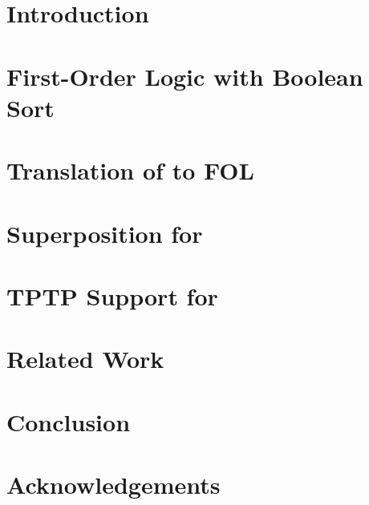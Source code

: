 \section{Introduction}
\label{sec:cicm15/introduction}



\section[First-Order Logic with Boolean Sort]{First-Order Logic with Boolean Sort}
\label{sec:folbool}



\section{Translation of \folb{} to FOL}
\label{sec:folb-to-fol}



\section{Superposition for \folb{}}
\label{sec:superposition}



\section{TPTP Support for \folb{}}
\label{sec:tptp}



\section{Related Work}
\label{sec:cicm15/related}



\section{Conclusion}
\label{sec:cicm15/conclusions}



\section*{Acknowledgements}
\label{sec:cicm15/acknowledgements}


